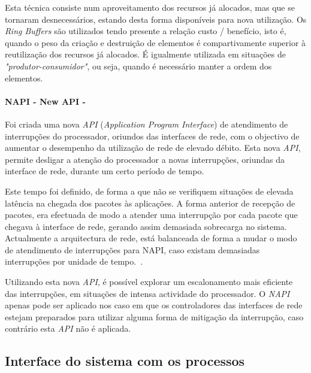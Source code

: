 Esta técnica consiste num aproveitamento dos recursos já alocados, mas que se tornaram desnecessários, estando desta forma disponíveis para nova utilização.
Os \textit{Ring Buffers} são utilizados tendo presente a relação custo / benefício, isto é, quando o peso da criação e destruição de elementos é compartivamente superior à reutilização dos recursos já alocados.
É igualmente utilizada em situações de \textit{"produtor-consumidor"}, ou seja, quando é necessário manter a ordem dos elementos.

\paragraph*{NAPI - New API - }

Foi criada uma nova \textit{API} (\textit{Application Program Interface}) de atendimento de interrupções do processador, oriundos das interfaces de rede, com o objectivo de aumentar o desempenho da utilização de rede de elevado débito.
Esta nova \textit{API}, permite desligar a atenção do processador a novas interrupções, oriundas da interface de rede, durante um certo período de tempo.

Este tempo foi definido, de forma a que não se verifiquem situações de elevada latência na chegada dos pacotes às aplicações.
A forma anterior de recepção de pacotes, era efectuada de modo a atender uma interrupção por cada pacote que chegava à interface de rede, gerando assim demasiada sobrecarga no sistema.
Actualmente a arquitectura de rede, está balanceada de forma a mudar o modo de atendimento de interrupções para NAPI, caso existam demasiadas interrupções por unidade de tempo.~\cite{administrator:napi}.

Utilizando esta nova \textit{API}, é possível explorar um escalonamento mais eficiente das interrupções, em situações de intensa actividade do processador.
O \textit{NAPI} apenas pode ser aplicado nos caso em que os controladores das interfaces de rede estejam preparados para utilizar alguma forma de mitigação da interrupção, caso contrário esta \textit{API} não é aplicada.

\subsection{Interface do sistema com os processos}
% 

